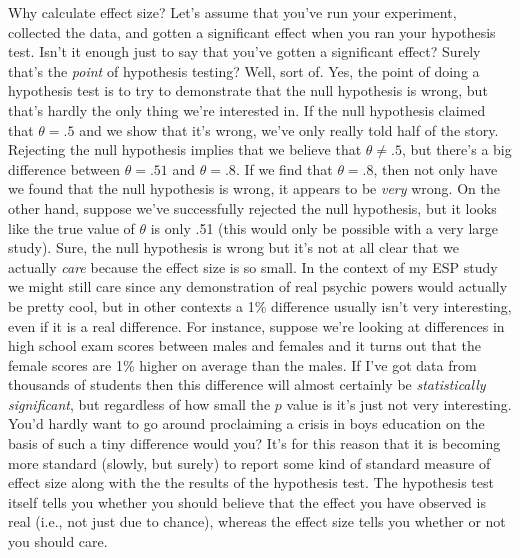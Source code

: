 Why calculate effect size? Let's assume that you've run your experiment, collected the data, and gotten a significant effect when you ran your hypothesis test. Isn't it enough just to say that you've gotten a significant effect? Surely that's the {\it point} of hypothesis testing? Well, sort of. Yes, the point of doing a hypothesis test is to try to demonstrate that the null hypothesis is wrong, but that's hardly the only thing we're interested in. If the null hypothesis claimed that $\theta = .5$ and we show that it's wrong, we've only really told half of the story. Rejecting the null hypothesis implies that we believe that $\theta \neq .5$, but there's a big difference between $\theta = .51$ and $\theta = .8$. If we find that $\theta = .8$, then not only have we found that the null hypothesis is wrong, it appears to be {\it very} wrong. On the other hand, suppose we've successfully rejected the null hypothesis, but it looks like the true value of $\theta$ is only .51 (this would only be possible with a very large study). Sure, the null hypothesis is wrong but it's not at all clear that we actually {\it care} because the effect size is so small. In the context of my ESP study we might still care since any demonstration of real psychic powers would actually be pretty cool, but in other contexts a 1\% difference usually isn't very interesting, even if it is a real difference. For instance, suppose we're looking at differences in high school exam scores between males and females and it turns out that the female scores are 1\% higher on average than the males. If I've got data from thousands of students then this difference will almost certainly be {\it statistically significant}, but regardless of how small the $p$ value is it's just not very interesting. You'd hardly want to go around proclaiming a crisis in boys education on the basis of such a tiny difference would you? It's for this reason that it is becoming more standard (slowly, but surely) to report some kind of standard measure of effect size along with the the results of the hypothesis test. The hypothesis test itself tells you whether you should believe that the effect you have observed is real (i.e., not just due to chance), whereas the effect size tells you whether or not you should care.


